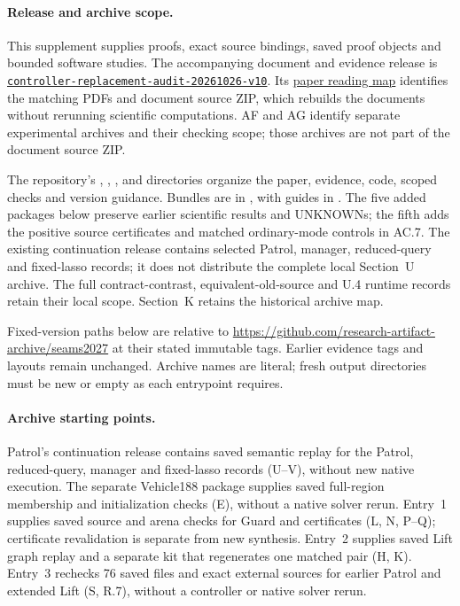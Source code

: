 

\paragraph{Release and archive scope.}
This supplement supplies proofs, exact source bindings, saved proof
objects and bounded software studies. The accompanying document and evidence release is
\href{https://github.com/research-artifact-archive/seams2027/tree/controller-replacement-audit-20261026-v10}{\nolinkurl{controller-replacement-audit-20261026-v10}}.
Its \href{https://github.com/research-artifact-archive/seams2027/blob/controller-replacement-audit-20261026-v10/paper/README.md}{paper reading map}
identifies the matching PDFs and document source ZIP, which rebuilds the
documents without rerunning scientific computations. AF and AG identify
separate experimental archives and their checking scope; those archives
are not part of the document source ZIP.

The repository's , , ,
 and  directories organize the paper,
evidence, code, scoped checks and version guidance. Bundles are in
, with guides in .
The five added packages below preserve earlier scientific results and
UNKNOWNs; the fifth adds the positive source certificates and matched
ordinary-mode controls in AC.7. The existing continuation release contains selected Patrol,
manager, reduced-query and fixed-lasso records; it does not distribute
the complete local Section~U archive. The full contract-contrast,
equivalent-old-source and U.4 runtime records retain their local scope.
Section~K retains the historical archive map.

Fixed-version paths below are relative to
\url{https://github.com/research-artifact-archive/seams2027} at their stated
immutable tags. Earlier evidence tags and layouts remain unchanged.
Archive names are literal; fresh output directories must be new or
empty as each entrypoint requires.

\paragraph{Archive starting points.}
Patrol's continuation release contains saved semantic replay for the
Patrol, reduced-query, manager and fixed-lasso records (U--V), without new
native execution. The separate Vehicle188 package supplies saved full-region
membership and initialization checks (E), without a native solver rerun.
Entry~1 supplies saved source and arena checks for Guard and certificates
(L, N, P--Q); certificate revalidation is separate from new synthesis.
Entry~2 supplies saved Lift graph replay and a separate kit that regenerates
one matched pair (H, K). Entry~3 rechecks 76 saved files and exact external
sources for earlier Patrol and extended Lift (S, R.7), without a controller
or native solver rerun.

